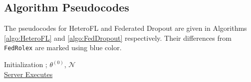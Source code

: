 \documentclass{article}
\begin{document}


\newpage
\subsection{Algorithm Pseudocodes}
\label{app:algorithm_pseudocode}
The pseudocodes for HeteroFL and Federated Dropout are given in Algorithms \ref{algo:HeteroFL} and \ref{algo:FedDropout} respectively. Their differences from \texttt{FedRolex} are marked using blue color. 

\begin{algorithm}[!h]
\caption{\textbf{HeteroFL}}
\label{algo:HeteroFL}

    Initialization ; $\theta^{(0)}$, $\mathcal{N}$\\
    \underline{Server Executes}\\    
\end{algorithm}
\end{document}
